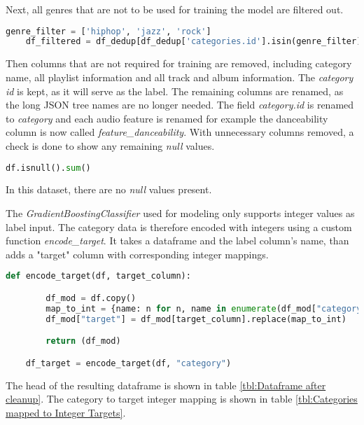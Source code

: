 Next, all genres that are not to be used for training the model are filtered out.

\begin{lstlisting}[language=Python]
    genre_filter = ['hiphop', 'jazz', 'rock']
    df_filtered = df_dedup[df_dedup['categories.id'].isin(genre_filter)]
\end{lstlisting}

Then columns that are not required for training are removed, including category name, all playlist information and
all track and album information. The \emph{category id} is kept, as it will serve as the label.
The remaining columns are renamed, as the long JSON tree names are no longer needed.
The field \emph{category.id} is renamed to \emph{category} and each audio feature is renamed for example 
the danceability column is now called \emph{feature\_danceability}.
With unnecessary columns removed, a check is done to show any remaining \emph{null} values.

\begin{lstlisting}[language=Python]
    df.isnull().sum()
\end{lstlisting}

In this dataset, there are no \emph{null} values present.

The \emph{GradientBoostingClassifier} used for modeling only supports integer values as label input.
The category data is therefore encoded with integers using a custom function \emph{encode\_target}.
It takes a dataframe and the label column's name, than adds a "target" column with corresponding integer mappings.

\begin{lstlisting}[language=Python]
    def encode_target(df, target_column):

        df_mod = df.copy()
        map_to_int = {name: n for n, name in enumerate(df_mod["category"].unique())}
        df_mod["target"] = df_mod[target_column].replace(map_to_int)

        return (df_mod)

    df_target = encode_target(df, "category")
\end{lstlisting}

The head of the resulting dataframe is shown in table \ref{tbl:Dataframe after cleanup}.
The category to target integer mapping is shown in table \ref{tbl:Categories mapped to Integer Targets}.

